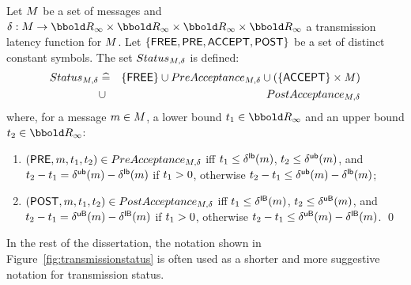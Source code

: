 \begin{definition}\label{def:bctransmissionstatus}
Let ${M}$ be a set of messages and
$\latency : \M \fun \TimeInf \cross \TimeInf \cross \TimeInf \cross
\TimeInf$ a transmission latency function for ${M}$. Let
$\{{\sf FREE},{\sf PRE},{\sf ACCEPT},{\sf POST}\}$ be a set of distinct constant symbols.  
The set ${Status_{{M},\delta}}$ is defined:
\begin{eqnarray*}
{Status_{{M},\delta}} & \mathrel{\widehat=} & \{{\sf FREE}\} \cup {PreAcceptance_{{M},\delta}}
                               \cup (\{{\sf ACCEPT}\} \times {M}) \\
                     & \cup  & {PostAcceptance_{{M},\delta}}
\end{eqnarray*}
where, for a message $m \in {M}$, a lower bound $\ti_1 \in \TimeInf$ and 
an upper bound $\ti_2 \in \TimeInf$:
\begin{enumerate}
\item $({\sf PRE},{m},{t}_1,{t}_2) \in {PreAcceptance_{{M},\delta}}$ iff
${t}_1 \leq {\delta^{{\sf lb}}}({m})$, ${t}_2 \leq {\delta^{{\sf ub}}}({m})$, and ${t}_2 - {t}_1 =
{\delta^{{\sf ub}}}({m}) - {\delta^{{\sf lb}}}({m})$ if ${t}_1 > 0$, otherwise ${t}_2 - {t}_1
\leq {\delta^{{\sf ub}}}({m}) - {\delta^{{\sf lb}}}({m})$; 
\item $({\sf POST},{m},{t}_1,{t}_2) \in {PostAcceptance_{{M},\delta}}$ iff
${t}_1 \leq {\delta^{{\sf lB}}}({m})$, ${t}_2 \leq {\delta^{{\sf uB}}}({m})$, and ${t}_2 - {t}_1 =
{\delta^{{\sf uB}}}({m}) - {\delta^{{\sf lB}}}({m})$ if ${t}_1 > 0$, otherwise ${t}_2 - {t}_1
\leq {\delta^{{\sf uB}}}({m}) - {\delta^{{\sf lB}}}({m})$.
\qed
\end{enumerate}
\end{definition}
\begin{notation}
In the rest of the dissertation, the notation shown in
Figure~\ref{fig:transmissionstatus} is often used as a shorter and more
suggestive notation for transmission status.
\end{notation}

